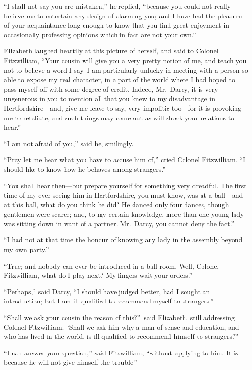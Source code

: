 \documentclass[12pt,english]{book}
\begin{document}
{}``I shall not say you are mistaken,'' he replied, {}``because
you could not really believe me to entertain any design of alarming
you; and I have had the pleasure of your acquaintance long enough
to know that you find great enjoyment in occasionally professing opinions
which in fact are not your own.''

Elizabeth laughed heartily at this picture of herself, and said to
Colonel Fitzwilliam, {}``Your cousin will give you a very pretty
notion of me, and teach you not to believe a word I say. I am particularly
unlucky in meeting with a person so able to expose my real character,
in a part of the world where I had hoped to pass myself off with some
degree of credit. Indeed, Mr.\ Darcy, it is very ungenerous in you
to mention all that you knew to my disadvantage in Hertfordshire\mbox{---}and,
give me leave to say, very impolitic too\mbox{---}for it is provoking
me to retaliate, and such things may come out as will shock your relations
to hear.''

{}``I am not afraid of you,'' said he, smilingly.

{}``Pray let me hear what you have to accuse him of,'' cried Colonel
Fitzwilliam. {}``I should like to know how he behaves among strangers.''

{}``You shall hear then\mbox{---}but prepare yourself for something
very dreadful. The first time of my ever seeing him in Hertfordshire,
you must know, was at a ball\mbox{---}and at this ball, what do you
think he did? He danced only four dances, though gentlemen were scarce;
and, to my certain knowledge, more than one young lady was sitting
down in want of a partner. Mr.\ Darcy, you cannot deny the fact.''

{}``I had not at that time the honour of knowing any lady in the
assembly beyond my own party.''

{}``True; and nobody can ever be introduced in a ball-room. Well,
Colonel Fitzwilliam, what do I play next? My fingers wait your orders.''

{}``Perhaps,'' said Darcy, {}``I should have judged better, had
I sought an introduction; but I am ill-qualified to recommend myself
to strangers.''

{}``Shall we ask your cousin the reason of this?''\ said Elizabeth,
still addressing Colonel Fitzwilliam. {}``Shall we ask him why a
man of sense and education, and who has lived in the world, is ill
qualified to recommend himself to strangers?''\ 

{}``I can answer your question,'' said Fitzwilliam, {}``without
applying to him. It is because he will not give himself the trouble.''
\end{document}
